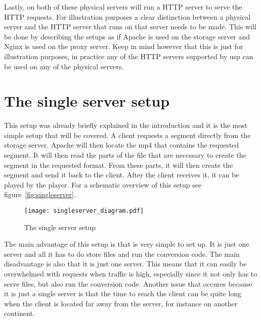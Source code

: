 \documentclass[twoside,openright]{uva-bachelor-thesis}
\begin{document}
Lastly, on both of these physical servers will run a HTTP server to serve the
HTTP requests. For illustration purposes a clear distinction between a
physical server and the HTTP server that runs on that server needs to be made.
This will be done by describing the setups as if Apache is used on the storage
server and Nginx is used on the proxy server. Keep in mind however that this is
just for illustration purposes, in practice any of the HTTP servers supported by
\gls{usp} can be used on any of the physical servers.


\section{The single server setup}
This setup was already briefly explained in the introduction and it is the most
simple setup that will be covered. A client requests a segment directly from the
storage server. Apache will then locate the mp4 that contains the requested
segment. It will then read the parts of the file that are necessary to create
the segment in the requested format. From these parts, it will then create the
segment and send it back to the client. After the client receives it, it can be
played by the player. For a schematic overview of this setup see
figure~\vref{fig:singleserver}.

\begin{figure}
    \texttt{[image: singleserver\_diagram.pdf]}
    \caption{The single server setup}\label{fig:singleserver}
\end{figure}

The main advantage of this setup is that is very simple to set up. It is just
one server and all it has to do store files and run the conversion code. The
main disadvantage is also that it is just one server. This means that it can
easily be overwhelmed with requests when traffic is high, especially since it
not only has to serve files, but also run the conversion code. Another issue
that occures because it is just a single server is that the time to reach the
client can be quite long when the client is located far away from the server,
for instance on another continent.

\end{document}
